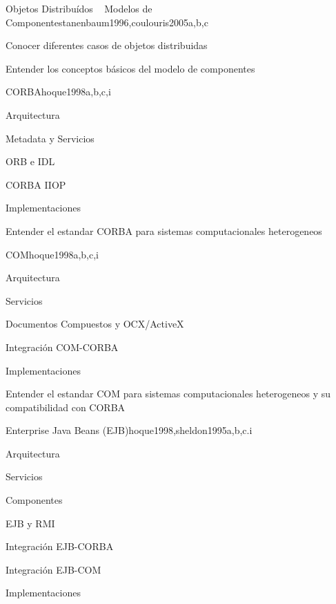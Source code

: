 \begin{syllabus}
\begin{unit}{Objetos Distribuídos ~ Modelos de Componentes}{tanenbaum1996,coulouris2005}{a,b,c}
   \begin{learningoutcomes}
      \item Conocer diferentes casos de objetos distribuidas
      \item Entender los conceptos básicos del modelo de componentes
   \end{learningoutcomes}
\end{unit}

\begin{unit}{CORBA}{hoque1998}{a,b,c,i}
   \begin{topics}
      \item Arquitectura
      \item Metadata y Servicios
      \item ORB e IDL
      \item CORBA IIOP
      \item Implementaciones
   \end{topics}

   \begin{learningoutcomes}
      \item Entender el estandar CORBA para sistemas computacionales heterogeneos
   \end{learningoutcomes}
\end{unit}

\begin{unit}{COM}{hoque1998}{a,b,c,i}
   \begin{topics}
      \item Arquitectura
      \item Servicios
      \item Documentos Compuestos y OCX/ActiveX
      \item Integración COM-CORBA
      \item Implementaciones
   \end{topics}

   \begin{learningoutcomes}
      \item  Entender el estandar COM para sistemas computacionales heterogeneos y su compatibilidad con CORBA
   \end{learningoutcomes}
\end{unit}

\begin{unit}{Enterprise Java Beans (EJB)}{hoque1998,sheldon1995}{a,b,c.i}
   \begin{topics}
      \item Arquitectura
      \item Servicios
      \item Componentes
      \item EJB y RMI
      \item Integración EJB-CORBA
      \item Integración EJB-COM
      \item Implementaciones
   \end{topics}


\end{unit}
\end{syllabus}
